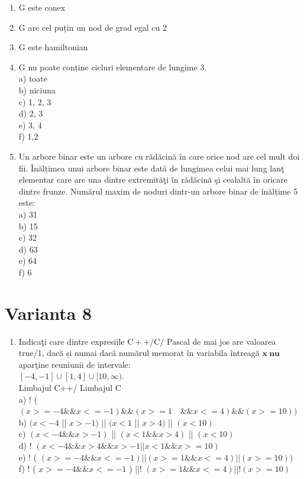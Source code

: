 \documentclass[10pt]{article}
\begin{document}
\begin{enumerate}
  \item G este conex
  \item G are cel puțin un nod de grad egal cu 2
  \item G este hamiltonian
  \item G nu poate conține cicluri elementare de lungime 3.\\
a) toate\\
b) niciuna\\
c) 1, 2, 3\\
d) 2, 3\\
e) 3, 4\\
f) 1,2
  \item Un arbore binar este un arbore cu rădăcină în care orice nod are cel mult doi fii. Înălțimea unui arbore binar este dată de lungimea celui mai lung lanţ elementar care are una dintre extremităţi în rădăcină şi cealaltă în oricare dintre frunze. Numărul maxim de noduri dintr-un arbore binar de înălțime 5 este:\\
a) 31\\
b) 15\\
c) 32\\
d) 63\\
e) 64\\
f) 6
\end{enumerate}

\section*{Varianta 8}
\begin{enumerate}
  \item Indicaţi care dintre expresiile $\mathrm{C}++/ \mathrm{C} /$ Pascal de mai jos are valoarea true/1, dacă și numai dacă numărul memorat în variabila întreagă $\mathbf{x ~ n u}$ aparţine reuniunii de intervale:\\
$[-4,-1] \cup[1,4] \cup[10, \infty)$.\\
Limbajul C++/ Limbajul C\\
a) ! ( $(x>=-4 \& \& x<=-1) \& \&(x>=1 \quad \& \& x<=4) \& \&(x>=10))$\\
b) $(x<-4$ || $x>-1)$ || $(x<1$ || $x>4)$ || $(x<10)$\\
c) $(x<-4 \& \& x>-1)$ || $(x<1 \& \& x>4)$ || $(x<10)$\\
d) ! $(x<-4 \& \& x>4 \& \& x>-1| | x<1 \& \& x>=10)$\\
e) ! ( $(x>=-4 \& \& x<=-1)||(x>=1 \& \& x<=4)||(x>=10))$\\
f) ! ( $x>=-4 \& \& x<=-1$ ) ||! $(x>=1 \& \& x<=4)|\mid!(x>=10)$
\end{enumerate}
\end{document}
